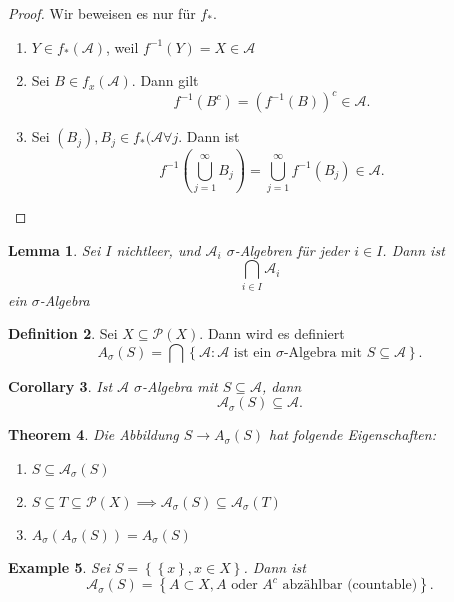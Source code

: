 \documentclass[prb,12pt]{revtex4-2}
\newtheorem{Theorem}{Theorem}
\newtheorem{Lemma}[Theorem]{Lemma}
\newtheorem{Corollary}[Theorem]{Corollary}
\newtheorem{Example}[Theorem]{Example}
\theoremstyle{definition}
\theoremstyle{definition}
\newtheorem{Definition}[Theorem]{Definition}
\begin{document}
\begin{proof}
	Wir beweisen es nur f\"{u}r $f_*$.
	\begin{enumerate}
		\item $Y\in f_*(\mathcal{A})$, weil $f^{-1}(Y)=X\in \mathcal{A}$ 
		\item Sei $B\in f_x(\mathcal{A})$. Dann gilt
			\[
				f^{-1}\left( B^c \right) =\left( f^{-1}(B) \right)^c\in \mathcal{A}
			.\] 
		\item Sei $(B_j), B_j\in f_*(\mathcal{A}\forall j$. Dann ist
			\[
				f^{-1}\left( \bigcup_{j=1} ^\infty B_j \right) =\bigcup_{j=1} ^\infty f^{-1}(B_j)\in \mathcal{A}
			.\] 
	\end{enumerate}
\end{proof}

\begin{Lemma}
	Sei $I$ nichtleer, und $\mathcal{A}_i$ $\sigma$-Algebren f\"{u}r jeder $i\in I$. Dann ist
	\[
		\bigcap_{i\in I} \mathcal{A}_i
	\] ein $\sigma$-Algebra
\end{Lemma}

\begin{Definition}
	Sei $X\subseteq \mathcal{P}(X)$. Dann wird es definiert
	\[
		A_\sigma(S)=\bigcap \left\{ \mathcal{A}: \mathcal{A} \text{ ist ein $\sigma$-Algebra mit } S\subseteq \mathcal{A} \right\}  
	.\] 
\end{Definition}

\begin{Corollary}
	Ist $\mathcal{A}$ $\sigma$-Algebra mit $S\subseteq \mathcal{A}$, dann 
	\[
		\mathcal{A}_\sigma(S)\subseteq\mathcal{A}
	.\] 
\end{Corollary}

\begin{Theorem}
	Die Abbildung $S\to A_\sigma(S)$ hat folgende Eigenschaften:
	\begin{enumerate}
		\item $S\subseteq \mathcal{A}_\sigma(S)$ 
		\item $S\subseteq T \subseteq \mathcal{P}(X)\implies \mathcal{A}_\sigma(S)\subseteq \mathcal{A}_\sigma(T)$ 
		\item $A_\sigma(A_\sigma(S))=A_\sigma(S)$
	\end{enumerate}
\end{Theorem}

\begin{Example}
	Sei $S=\left\{ \left\{ x \right\} , x\in X \right\} $. Dann ist
	\[
		\mathcal{A}_\sigma(S)=\left\{ A\subset X, A\text{ oder }A^c\text{ abz\"{a}hlbar (countable)} \right\} 
	.\] 
\end{Example}
\end{document}
